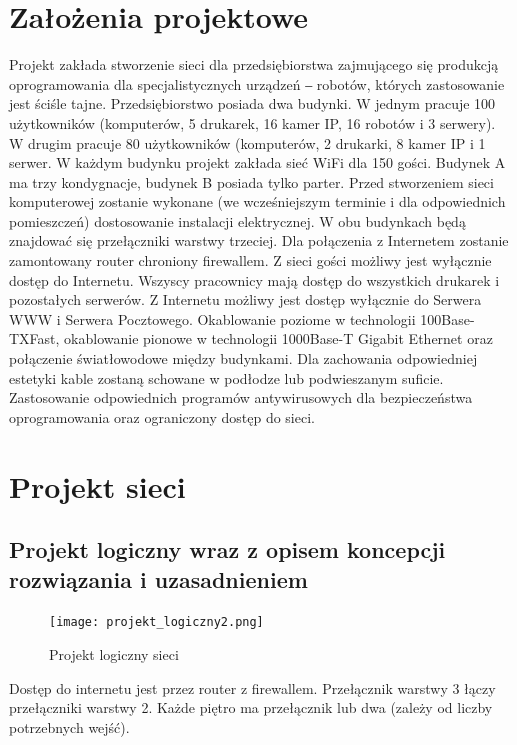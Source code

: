 \documentclass{article}
\begin{document}
\section{Założenia projektowe}
Projekt zakłada stworzenie sieci dla przedsiębiorstwa zajmującego się produkcją oprogramowania dla specjalistycznych urządzeń ‒ robotów, których zastosowanie jest ściśle tajne. Przedsiębiorstwo posiada dwa budynki. W jednym pracuje 100 użytkowników (komputerów, 5 drukarek, 16 kamer IP, 16 robotów i 3 serwery). W drugim pracuje 80 użytkowników (komputerów, 2 drukarki, 8 kamer IP i 1 serwer. W każdym budynku projekt zakłada sieć WiFi dla 150 gości. Budynek A ma trzy kondygnacje, budynek B posiada tylko parter. Przed stworzeniem sieci komputerowej zostanie wykonane (we wcześniejszym terminie i dla odpowiednich pomieszczeń) dostosowanie instalacji elektrycznej.
W obu budynkach będą znajdować się przełączniki warstwy trzeciej.
Dla połączenia z Internetem zostanie zamontowany router chroniony firewallem.
Z sieci gości możliwy jest wyłącznie dostęp do Internetu.
Wszyscy pracownicy mają dostęp do wszystkich drukarek i pozostałych serwerów. Z Internetu możliwy jest dostęp wyłącznie do Serwera WWW i Serwera Pocztowego.
Okablowanie poziome w technologii 100Base-TXFast, okablowanie pionowe w technologii 1000Base-T Gigabit Ethernet oraz połączenie światłowodowe między budynkami. Dla zachowania odpowiedniej estetyki kable zostaną schowane w podłodze lub podwieszanym suficie.
Zastosowanie odpowiednich programów antywirusowych dla bezpieczeństwa oprogramowania oraz ograniczony dostęp do sieci.

\newpage
\section{Projekt sieci}
\subsection{Projekt logiczny wraz z opisem koncepcji rozwiązania i uzasadnieniem}
\begin{figure}[!ht]	
	\centering
	\texttt{[image: projekt\_logiczny2.png]}
	\caption{Projekt logiczny sieci}
	\label{fig:obrazek 1}
\end{figure}
Dostęp do internetu jest przez router z firewallem. Przełącznik warstwy 3 łączy przełączniki warstwy 2. Każde piętro ma przełącznik lub dwa (zależy od liczby potrzebnych wejść).
\end{document}
